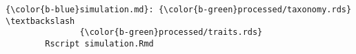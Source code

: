 \documentclass[class=minimal,border=0]{standalone}
\begin{document}
%
\begin{BVerbatim}[bgcolor=b-darkgrey]
{\color{b-blue}simulation.md}: {\color{b-green}processed/taxonomy.rds} \textbackslash
               {\color{b-green}processed/traits.rds}
        Rscript simulation.Rmd
\end{BVerbatim}
\end{document}
